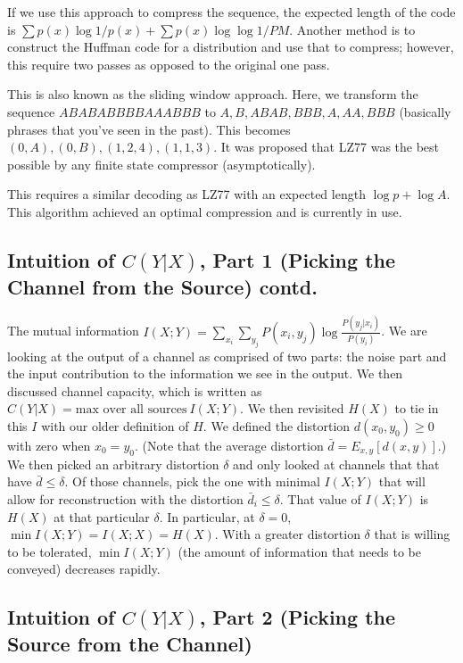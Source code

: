 \documentclass[11pt]{article}
\theoremstyle{definition}
\newcommand{\xhdr}[1]{\vspace{2mm}\noindent{{\bf #1.}}}
\begin{document}
If we use this approach to compress the sequence, the expected length of the code is $\sum p(x) \log 1/p(x) + \sum p(x) \log \log 1/PM$. Another method is to construct the Huffman code for a distribution and use that to compress; however, this require two passes as opposed to the original one pass.   

\xhdr{LZ77} This is also known as the sliding window approach. Here, we transform the sequence $ABABABBBBAAABBB$ to $A, B, ABAB, BBB, A, AA, BBB$ (basically phrases that you've seen in the past). This becomes $(0, A), (0, B), (1, 2, 4), (1, 1, 3)$. It was proposed that LZ77 was the best possible by any finite state compressor (asymptotically). 

\xhdr{Find the Longest Match: LZ78} This requires a similar decoding as LZ77 with an expected length $\log p + \log A$. This algorithm achieved an optimal compression and is currently in use.

\subsection{Intuition of $C(Y | X)$, Part 1 (Picking the Channel from the Source) contd.}

The mutual information $I(X; Y) = \sum_{x_i} \sum_{y_j} P(x_i, y_j) \log \frac{P(y_j | x_i)}{P(y_i)}$. We are looking at the output of a channel as comprised of two parts: the noise part and the input contribution to the information we see in the output. We then discussed channel capacity, which is written as $C(Y|X) = \text{max over all sources} \: I(X;Y)$. We then revisited $H(X)$ to tie in this $I$ with our older definition of $H$. We defined the distortion $d(x_0, y_0) \geq 0$ with zero when $x_0 = y_0$. (Note that the average distortion $\bar{d} = E_{x,y}[d(x,y)]$.) We then picked an arbitrary distortion $\delta$ and only looked at channels that that have $\bar{d} \leq \delta$. Of those channels, pick the one with minimal $I(X;Y)$ that will allow for reconstruction with the distortion $\bar{d}_i \leq \delta$. That value of $I(X;Y)$ is $H(X)$ at that particular $\delta$. In particular, at $\delta = 0$, $\min I(X;Y) = I(X ; X) = H(X)$. With a greater distortion $\delta$ that is willing to be tolerated, $\min I(X;Y)$ (the amount of information that needs to be conveyed) decreases rapidly. 

\subsection{Intuition of $C(Y|X)$, Part 2 (Picking the Source from the Channel)}
\end{document}

